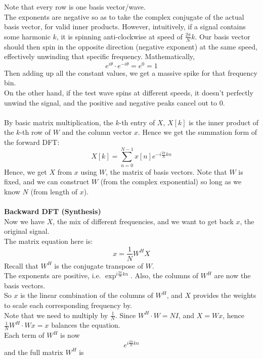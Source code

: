 \documentclass[../linear-algebra.tex]{subfiles}
\begin{document}
Note that every row is one basis vector/wave.\\
The exponents are negative so as to take the complex conjugate of the actual basis vector, for valid inner products.
However, intuitively, if a signal contains some harmonic $k$, it is spinning anti-clockwise at speed of $\frac{2\pi}{N}k$.
Our basis vector should then spin in the opposite direction (negative exponent) at the same speed, effectively unwinding that specific frequency.
Mathematically,
$$e^{i\theta}\cdot e^{-i\theta} = e^0 = 1$$
Then adding up all the constant values, we get a massive spike for that frequency bin.\\
On the other hand, if the test wave spins at different speeds, it doesn't perfectly unwind the signal, and the positive and negative peaks cancel out to 0.\\
\\
By basic matrix multiplication, the $k$-th entry of $X$, $X[k]$ is the inner product of the $k$-th row of $W$ and the column vector $x$.
Hence we get the summation form of the forward DFT:
$$X[k] = \sum_{n=0}^{N-1} x[n] e^{-i \frac{2\pi}{N} kn}$$
Hence, we get $X$ from $x$ using $W$, the matrix of basis vectors.
Note that $W$ is fixed, and we can construct $W$ (from the complex exponential) so long as we know $N$ (from length of $x$).\\
\\
\textbf{Backward DFT (Synthesis)}\\
Now we have $X$, the mix of different frequencies, and we want to get back $x$, the original signal.\\
The matrix equation here is:
$$x = \frac{1}{N} W^H X$$
Recall that $W^H$ is the conjugate transpose of $W$.\\
The exponents are positive, i.e. $\exp^{i\frac{2\pi}{N}kn}$.
Also, the columns of $W^H$ are now the basis vectors.\\
So $x$ is the linear combination of the columns of $W^H$, and $X$ provides the weights to scale each corresponding frequency by.\\
Note that we need to multiply by $\frac{1}{N}$. Since $W^H\cdot W = NI$, and $X = Wx$, hence $\frac{1}{N}W^H\cdot W x = x$ balances the equation.\\
Each term of $W^H$ is now
$$e^{i\frac{2\pi}{N}k n}$$
and the full matrix $W^H$ is
\end{document}
